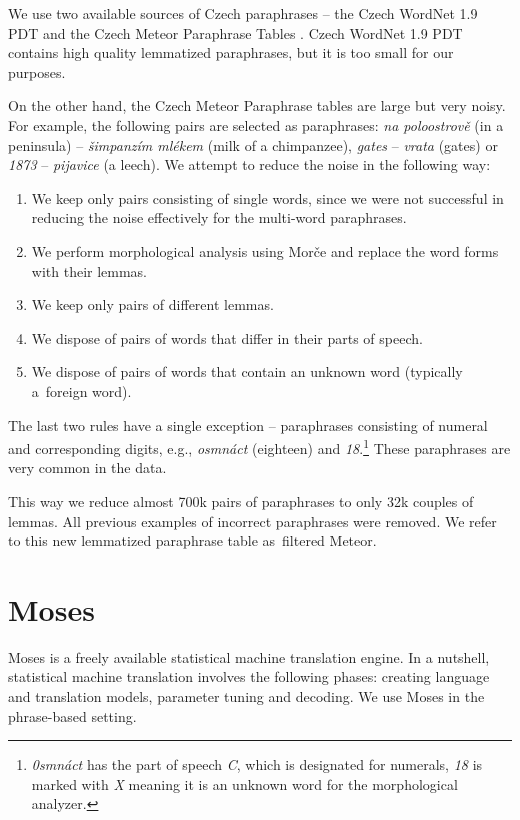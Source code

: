 We use two available sources of Czech paraphrases -- the Czech WordNet 1.9 PDT 
\cite{czech-wordnet} and the Czech Meteor Paraphrase Tables \cite{meteor-tables}. 
Czech WordNet 1.9 PDT contains high quality lemmatized paraphrases, but it is 
too small for our purposes.

On the other hand, the Czech Meteor Paraphrase tables are large but very noisy. 
For example, the following pairs are selected as paraphrases: 
\textit{na poloostrově} (in a peninsula) -- \textit{šimpanzím mlékem} (milk of 
a chimpanzee), \textit{gates} -- \textit{vrata} (gates) or \textit{1873} -- 
\textit{pijavice} (a leech). We attempt to reduce the noise in the following 
way:

\begin{enumerate}
\item We keep only pairs consisting of single words, since we were not successful in 
reducing the noise effectively for the multi-word paraphrases. \cite{barancikova:2014}
\item We perform morphological analysis using Mor\v{c}e \cite{morce:2007} and 
replace the word forms with their lemmas. 
\item We keep only pairs of different lemmas.
\item We dispose of pairs of words that differ in their parts of speech.
\item We dispose of pairs of words that contain an unknown word (typically a~foreign 
word).
\end{enumerate}

The last two rules have a single exception -- paraphrases consisting of numeral and 
corresponding digits, e.g., \textit{osmnáct} (eighteen) and \textit{18}.\footnote{
\textit{0smnáct} has the part of speech \textit{C}, which is designated for numerals, 
\textit{18} is marked with \textit{X} meaning it is an unknown word for the morphological
analyzer.} These paraphrases are very common in the data. 

This way we reduce almost 700k pairs of paraphrases to only 32k couples of lemmas. 
All previous examples of incorrect paraphrases were removed. We refer to this new 
lemmatized paraphrase table as~filtered Meteor.

\section{Moses}
Moses \cite{moses} is a freely available statistical machine translation engine. 
In a nutshell, statistical machine translation involves the following phases: creating 
language and translation models, parameter tuning and decoding. We use Moses in
the phrase-based setting.

